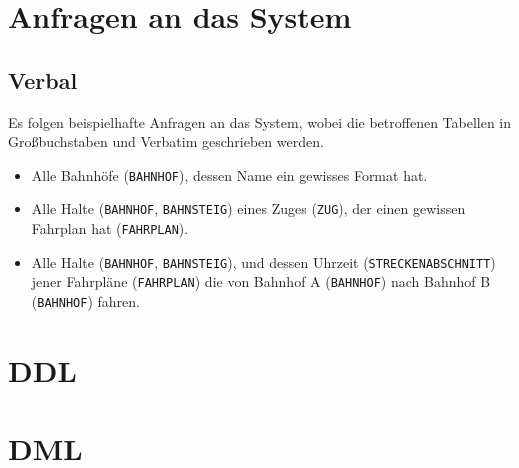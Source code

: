 \section{Anfragen an das System}
\subsection{Verbal}
Es folgen beispielhafte Anfragen an das System, wobei die betroffenen Tabellen in Großbuchstaben und Verbatim geschrieben werden.

\begin{itemize}
    \item Alle Bahnhöfe (\texttt{BAHNHOF}), dessen Name ein gewisses Format hat.
    \item Alle Halte (\texttt{BAHNHOF}, \texttt{BAHNSTEIG}) eines Zuges (\texttt{ZUG}), der einen gewissen Fahrplan
    hat (\texttt{FAHRPLAN}).
    \item Alle Halte (\texttt{BAHNHOF}, \texttt{BAHNSTEIG}), und dessen Uhrzeit (\texttt{STRECKENABSCHNITT})
    jener Fahrpläne (\texttt{FAHRPLAN}) die von Bahnhof A (\texttt{BAHNHOF}) nach Bahnhof B (\texttt{BAHNHOF})
    fahren.
\end{itemize}

\begin{appendices}
\section{DDL}\label{sec:ddl}



\section{DML}\label{sec:dml}











\end{appendices}